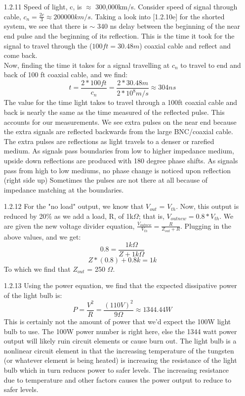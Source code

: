 \documentclass{article}
\begin{document}
\begin{itemize}
    \item[1.2.11] Speed of light, c, is $\approx$ 300,000km/s. Consider speed of signal through cable, $c_n = \frac{2 c}{3} \approx 200000 km/s$. Taking a look into [1.2.10e] for the shorted system, we see that there is $\sim$ 340 ns delay between the beginning of the near end pulse and the beginning of its reflection. This is the time it took for the signal to travel through the ($100ft = 30.48m$) coaxial cable and reflect and come back.\\ Now, finding the time it takes for a signal travelling at $c_n$ to travel to end and back of 100 ft coaxial cable, and we find:
    \begin{equation}
        t = \frac{2*100ft}{c_n} = \frac{2*30.48m}{2*10^{8} m/s} \approx 304 ns
    \end{equation}
    The value for the time light takes to travel through a 100ft coaxial cable and back is nearly the same as the time measured of the reflected pulse. This accounts for our measurements. We see extra pulses on the near end because the extra signals are reflected backwards from the large BNC/coaxial cable. The extra pulses are reflections as light travels to a denser or rarefied medium. As signals pass boundaries from low to higher impedance medium, upside down reflections are produced with 180 degree phase shifts. As signals pass from high to low mediums, no phase change is noticed upon reflection (right side up) Sometimes the pulses are not there at all because of impedance matching at the boundaries.
    
    \item[1.2.12] 
    For the "no load" output, we know that $V_{out}$ = $V_{th}$. Now, this output is reduced by 20\% as we add a load, R, of 1k$\Omega$; that is, $V_{out new} = 0.8*V_{th}$. We are given the new voltage divider equation, $\frac{V_{out new}}{V_{th}} = \frac{R}{Z_{out} + R}$. Plugging in the above values, and we get:
    \begin{equation}
        0.8 = \frac{1k\Omega}{Z + 1k\Omega}
    \end{equation}
    \begin{equation}
        Z*(0.8) + 0.8k = 1k
    \end{equation}
    To which we find that $Z_{out}$ = 250 $\Omega$.
    
    \item[1.2.13]  Using the power equation, we find that the expected dissipative power of the light bulb is:
    \begin{equation}
        P = \frac{V^{2}}{R} = \frac{(110V)^{2}}{9\Omega} \approx 1344.44 W
    \end{equation}
    This is certainly not the amount of power that we'd expect the 100W light bulb to use. The 100W power number is right here, else the 1344 watt power output will likely ruin circuit elements or cause burn out. The light bulb is a nonlinear circuit element in that the increasing temperature of the tungsten (or whatever element is being heated) is increasing the resistance of the light bulb which in turn reduces power to safer levels. The increasing resistance due to temperature and other factors causes the power output to reduce to safer levels.
        

\end{itemize}
\end{document}
